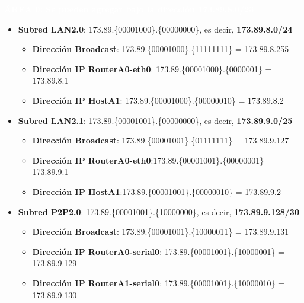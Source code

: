 \par \colorbox{marron}{\textbf{\textcolor{white}{ÁREA 0: Se pueden agregar bajo la dirección 173.89.8.0/23}}}
\begin{itemize}
	\item{\textbf{Subred LAN2.0}:} 173.89.\{\textcolor{azul}{000010}\textcolor{rojo}{00}\}.\{00000000\}, es decir, \textbf{173.89.8.0/24}
		\begin{itemize}
			\item{\textbf{Dirección Broadcast}}: 173.89.\{\textcolor{azul}{000010}\textcolor{rojo}{00}\}.\{11111111\} = 173.89.8.255
			\item{\textbf{Dirección IP RouterA0-eth0}}: 173.89.\{\textcolor{azul}{000010}\textcolor{rojo}{00}\}.\{0000001\} = 173.89.8.1
			\item{\textbf{Dirección IP HostA1}}: 173.89.\{\textcolor{azul}{000010}\textcolor{rojo}{00}\}.\{00000010\} = 173.89.8.2
		\end{itemize}
	\item{\textbf{Subred LAN2.1}:} 173.89.\{\textcolor{azul}{000010}\textcolor{rojo}{01}\}.\{\textcolor{rojo}{0}0000000\}, es decir, \textbf{173.89.9.0/25}
		\begin{itemize}
			\item{\textbf{Dirección Broadcast}}: 173.89.\{\textcolor{azul}{000010}\textcolor{rojo}{01}\}.\{\textcolor{rojo}{0}1111111\} = 173.89.9.127
			\item{\textbf{Dirección IP RouterA0-eth0}}:173.89.\{\textcolor{azul}{000010}\textcolor{rojo}{01}\}.\{\textcolor{rojo}{0}0000001\} = 173.89.9.1
			\item{\textbf{Dirección IP HostA1}}:173.89.\{\textcolor{azul}{000010}\textcolor{rojo}{01}\}.\{\textcolor{rojo}{0}0000010\} = 173.89.9.2
		\end{itemize}
	\item{\textbf{Subred P2P2.0}:} 173.89.\{\textcolor{azul}{000010}\textcolor{rojo}{01}\}.\{\textcolor{rojo}{100000}00\}, es decir, \textbf{173.89.9.128/30}
		\begin{itemize}
			\item{\textbf{Dirección Broadcast}}: 173.89.\{\textcolor{azul}{000010}\textcolor{rojo}{01}\}.\{\textcolor{rojo}{100000}11\} = 173.89.9.131
			\item{\textbf{Dirección IP RouterA0-serial0}}: 173.89.\{\textcolor{azul}{000010}\textcolor{rojo}{01}\}.\{\textcolor{rojo}{100000}01\} = 173.89.9.129
			\item{\textbf{Dirección IP RouterA1-serial0}}: 173.89.\{\textcolor{azul}{000010}\textcolor{rojo}{01}\}.\{\textcolor{rojo}{100000}10\} = 173.89.9.130

\end{itemize}
\end{itemize}
